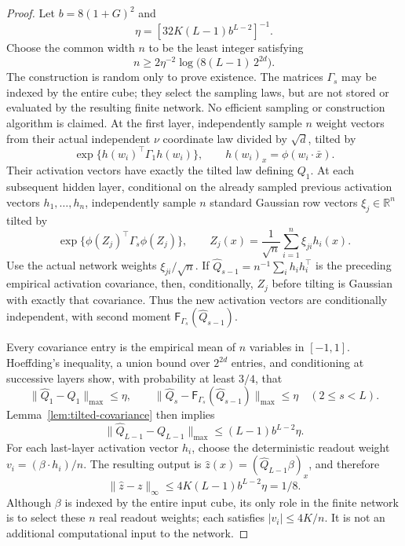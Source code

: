 \begin{proof}
Let $b=8(1+G)^2$ and
\[
 \eta=[32K(L-1)b^{L-2}]^{-1}.
\]
Choose the common width $n$ to be the least integer satisfying
\[
 n\geq2\eta^{-2}\log\bigl(8(L-1)\,2^{2d}\bigr).
\]
The construction is random only to prove existence.
The matrices $\Gamma_s$ may be indexed by the entire cube; they select the
sampling laws, but are not stored or evaluated by the resulting finite
network. No efficient sampling or construction algorithm is claimed.
At the first layer, independently sample $n$ weight vectors from their
actual independent $\nu$ coordinate law divided by $\sqrt d$, tilted by
\[
 \exp\{h(w_i)^\top\Gamma_1h(w_i)\},\qquad
 h(w_i)_x=\phi(w_i\cdot\bar x).
\]
Their activation vectors have exactly the tilted law defining $Q_1$.
At each subsequent hidden layer, conditional on the already sampled previous
activation vectors $h_1,\ldots,h_n$, independently sample $n$ standard
Gaussian row vectors $\xi_j\in\mathbb R^n$ tilted by
\[
 \exp\{\phi(Z_j)^\top\Gamma_s\phi(Z_j)\},
 \qquad Z_j(x)=\frac1{\sqrt n}\sum_{i=1}^n\xi_{ji}h_i(x).
\]
Use the actual network weights $\xi_{ji}/\sqrt n$.
If $\widehat Q_{s-1}=n^{-1}\sum_i h_ih_i^\top$ is the preceding empirical
activation covariance, then, conditionally, $Z_j$ before tilting is Gaussian
with exactly that covariance. Thus the new activation vectors are
conditionally independent, with second moment
$\mathsf F_{\Gamma_s}(\widehat Q_{s-1})$.

Every covariance entry is the empirical mean of $n$ variables in $[-1,1]$.
Hoeffding's inequality, a union bound over $2^{2d}$ entries, and conditioning
at successive layers show, with probability at least $3/4$, that
\[
 \|\widehat Q_1-Q_1\|_{\max}\leq\eta,\qquad
 \|\widehat Q_s-\mathsf F_{\Gamma_s}(\widehat Q_{s-1})\|_{\max}\leq\eta
 \quad(2\leq s<L).
\]
Lemma~\ref{lem:tilted-covariance} then implies
\[
 \|\widehat Q_{L-1}-Q_{L-1}\|_{\max}
 \leq (L-1)b^{L-2}\eta.
\]
For each last-layer activation vector $h_i$, choose the deterministic
readout weight $v_i=(\beta\cdot h_i)/n$. The resulting output is
$\widehat z(x)=(\widehat Q_{L-1}\beta)_x$, and therefore
\[
 \|\widehat z-z\|_\infty
 \leq4K(L-1)b^{L-2}\eta=1/8.
\]
Although $\beta$ is indexed by the entire input cube, its only role in the
finite network is to select these $n$ real readout weights; each satisfies
$|v_i|\leq4K/n$. It is not an additional computational input to the network.


\end{proof}

